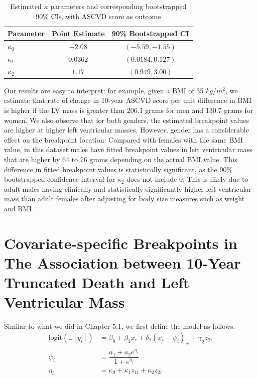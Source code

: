 \documentclass [12pt, proquest] {uwthesis}[2016/11/22]
\begin{document}
\begin{table}
\centering
\renewcommand\arraystretch{0.75}
\begin{tabular}{@{} lcc @{}} 
\toprule
    {Parameter} & {Point Estimate} & {90\% Bootstrapped CI} \\
\midrule
    $\kappa_0$ & $-2.08$ & $(-5.59, -1.55)$ \\
    $\kappa_1$ & $0.0362$ & $(0.0184, 0.127)$ \\
    $\kappa_2$ & $1.17$ & $(0.949, 3.00)$ \\
\bottomrule
\end{tabular}
\caption{Estimated $\kappa$ parameters and corresponding bootstrapped 90\% CIs, with ASCVD score as outcome}
\end{table}

Our results are easy to interpret: for example, given a BMI of 35 $kg/m^2$, we estimate that rate of change in 10-year ASCVD score per unit difference in BMI is higher if the LV mass is greater than 206.1 grams for men and 130.7 grams for women. We also observe that for both genders, the estimated breakpoint values are higher at higher left ventricular masses. However, gender has a considerable effect on the breakpoint location: Compared with females with the same BMI value, in this dataset males have fitted breakpoint values in left ventricular mass that are higher by 64 to 76 grams depending on the actual BMI value. This difference in fitted breakpoint values is statistically significant, as the 90\% bootstrapped confidence interval for $\kappa_2$ does not include 0. This is likely due to adult males having clinically and statistically significantly higher left ventricular mass than adult females after adjusting for body size measures such as weight and BMI \cite{GdS1995, CS2002}.

\section{Covariate-specific Breakpoints in The Association between 10-Year Truncated Death and Left Ventricular Mass}

Similar to what we did in Chapter 5.1, we first define the model as follows:
\begin{align}
    \text{logit}(\mathbb{E}[y_i]) &= \beta_0 + \beta_1 x_i + \delta_1 (x_i - \psi_i)_+ + \gamma_2 z_{2i} \\
    \psi_i &= \dfrac{a_1 + a_2 e^{\eta_i}}{1 + e^{\eta_i}} \\
    \eta_i &= \kappa_0 + \kappa_1 z_{1i} + \kappa_2 z_{2i}
\end{align}
\end{document}
